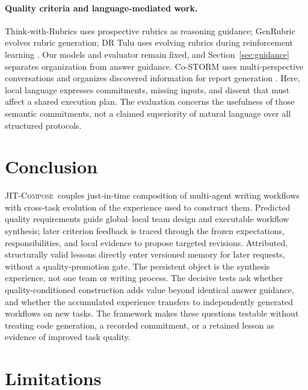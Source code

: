 \documentclass[11pt]{article}
\newcommand{\method}{\mbox{\textsc{JIT-Compose}}}
\begin{document}
\paragraph{Quality criteria and language-mediated work.}
Think-with-Rubrics uses prospective rubrics as reasoning guidance; GenRubric evolves rubric generation; DR Tulu uses evolving rubrics during reinforcement learning \citep{yu2026thinkrubrics,chen2026genrubric,shao2025drtulu}. Our models and evaluator remain fixed, and Section~\ref{sec:guidance} separates organization from answer guidance. Co-STORM uses multi-perspective conversations and organizes discovered information for report generation \citep{jiang2024costorm}. Here, local language expresses commitments, missing inputs, and dissent that must affect a shared execution plan. The evaluation concerns the usefulness of those semantic commitments, not a claimed superiority of natural language over all structured protocols.

\section{Conclusion}
\label{sec:conclusion}

\method\ couples just-in-time composition of multi-agent writing workflows with cross-task evolution of the experience used to construct them. Predicted quality requirements guide global--local team design and executable workflow synthesis; later criterion feedback is traced through the frozen expectations, responsibilities, and local evidence to propose targeted revisions. Attributed, structurally valid lessons directly enter versioned memory for later requests, without a quality-promotion gate. The persistent object is the synthesis experience, not one team or writing process. The decisive tests ask whether quality-conditioned construction adds value beyond identical answer guidance, and whether the accumulated experience transfers to independently generated workflows on new tasks. The framework makes these questions testable without treating code generation, a recorded commitment, or a retained lesson as evidence of improved task quality.
\label{mainend}

\section*{Limitations}
\end{document}

